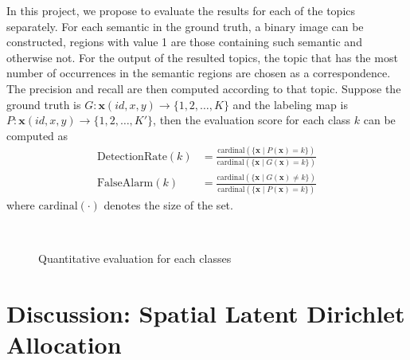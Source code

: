 \documentclass{acm_proc_article-sp}
\newcommand\mb\mathbf
\begin{document}
In this project, we propose to evaluate the results for each of the topics separately. For each semantic in the ground truth, a binary image can be constructed, regions with value 1 are those containing such semantic and otherwise not. For the output of the resulted topics, the topic that has the most number of occurrences in the semantic regions are chosen as a correspondence. The precision and recall are then computed according to that topic. Suppose the ground truth is $G:\mb{x}(id,x,y)\to\{1,2,\ldots,K\}$ and the labeling map is $P: \mb{x}(id,x,y)\to\{1,2,\ldots,K'\}$, then the evaluation score for each class $k$ can be computed as
\begin{align}
\text{DetectionRate}(k)&=\frac{\text{cardinal}\left(\{\mb{x}\mid P(\mb{x})=k\}\right)}{\text{cardinal}(\{\mb{x}\mid G(\mb{x})=k\})}\\
\text{FalseAlarm}(k)&=\frac{\text{cardinal}(\{\mb{x}\mid G(\mb{x})\not=k\})}{\text{cardinal}(\{ \mb{x}\mid P(\mb{x})=k\})}
\end{align}
where $\text{cardinal}(\cdot)$ denotes the size of the set.

\begin{figure}[!htb]
 \centering
 \\
 \caption{Quantitative evaluation for each classes}
\end{figure}

\section{Discussion: Spatial Latent Dirichlet Allocation}\label{sec:slda}
\end{document}
